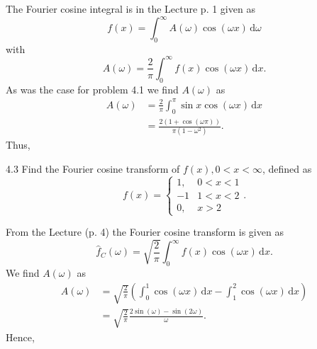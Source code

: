 \begin{derivation}
  The Fourier cosine integral is in the Lecture p. 1 given as
  \begin{equation*}
    f(x) = \int_{0}^{\infty} A(\omega) \cos(\omega x) \, \mathrm{d}\omega
  \end{equation*}
  with
  \begin{equation*}
    A(\omega) = \frac{2}{\pi} \int_{0}^{\infty} f(x) \cos (\omega x) \, \mathrm{d}x
  .\end{equation*}
  As was the case for problem 4.1 we find $A(\omega)$ as
  \begin{align*}
    A(\omega ) &= \frac{2}{\pi} \int_{0}^{\pi} \sin x \cos (\omega x) \, \mathrm{d}x \\
    &= \frac{2 \left( 1 + \cos(\omega\pi) \right)}{\pi \left( 1 - \omega^2 \right)}
  .\end{align*}
  Thus,
\end{derivation}



\begin{problem}{4.3}
  Find the Fourier cosine transform of $f(x), 0 < x < \infty$, defined as
\[ 
f(x) = \begin{cases}
1, & 0<x<1\\
-1 & 1<x<2 \\
0, & x > 2
\end{cases}
.\]
\end{problem}

\begin{derivation}
  From the Lecture (p. 4) the Fourier cosine transform is given as
  \begin{equation*}
    \hat{f}_C(\omega) = \sqrt{\frac{2}{\pi}} \int_{0}^{\infty} f(x) \cos(\omega x) \, \mathrm{d}x
  .\end{equation*}
  We find $A(\omega)$ as
  \begin{align*}
    A(\omega) &= \sqrt{\frac{2}{\pi}} \left( \int_{0}^{1} \cos (\omega x) \, \mathrm{d}x - \int_{1}^{2} \cos(\omega x) \, \mathrm{d}x \right) \\
    &= \sqrt{\frac{2}{\pi}} \frac{2\sin (\omega ) - \sin (2\omega)}{\omega }
  .\end{align*}
  Hence,
\end{derivation}


